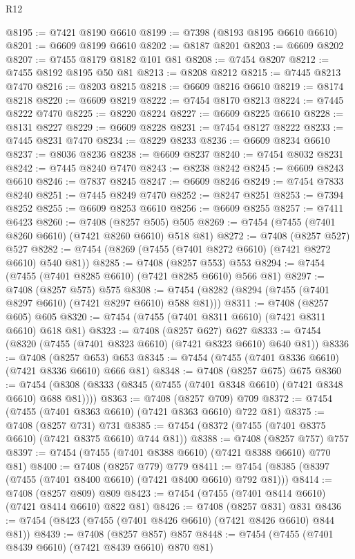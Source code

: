 \begin{lexlean}{R12}
\begin{coremodule}
{{{{{{{{{{{{{{{{{{{{{{{{{{{{{{{{{{{{{{{{{{{{{{{{{{{{{{{{{{{{{{{{{{{{{{{{{{{{{{{{{{@8195 := @7421 @8190 @6610
@8199 := @7398 (@8193 @8195 @6610 @6610)
@8201 := @6609 @8199 @6610
@8202 := @8187 @8201
@8203 := @6609 @8202
@8207 := @7455 @8179 @8182 @101 @81
@8208 := @7454 @8207
@8212 := @7455 @8192 @8195 @50 @81
@8213 := @8208 @8212
@8215 := @7445 @8213 @7470
@8216 := @8203 @8215
@8218 := @6609 @8216 @6610
@8219 := @8174 @8218
@8220 := @6609 @8219
@8222 := @7454 @8170 @8213
@8224 := @7445 @8222 @7470
@8225 := @8220 @8224
@8227 := @6609 @8225 @6610
@8228 := @8131 @8227
@8229 := @6609 @8228
@8231 := @7454 @8127 @8222
@8233 := @7445 @8231 @7470
@8234 := @8229 @8233
@8236 := @6609 @8234 @6610
@8237 := @8036 @8236
@8238 := @6609 @8237
@8240 := @7454 @8032 @8231
@8242 := @7445 @8240 @7470
@8243 := @8238 @8242
@8245 := @6609 @8243 @6610
@8246 := @7837 @8245
@8247 := @6609 @8246
@8249 := @7454 @7833 @8240
@8251 := @7445 @8249 @7470
@8252 := @8247 @8251
@8253 := @7394 @8252
@8255 := @6609 @8253 @6610
@8256 := @6609 @8255
@8257 := @7411 @6423
@8260 := @7408 (@8257 @505) @505
@8269 := @7454 (@7455 (@7401 @8260 @6610) (@7421 @8260 @6610) @518 @81)
@8272 := @7408 (@8257 @527) @527
@8282 := @7454 (@8269 (@7455 (@7401 @8272 @6610) (@7421 @8272 @6610) @540 @81))
@8285 := @7408 (@8257 @553) @553
@8294 := @7454 (@7455 (@7401 @8285 @6610) (@7421 @8285 @6610) @566 @81)
@8297 := @7408 (@8257 @575) @575
@8308 := @7454 (@8282 (@8294 (@7455 (@7401 @8297 @6610) (@7421 @8297 @6610) @588 @81)))
@8311 := @7408 (@8257 @605) @605
@8320 := @7454 (@7455 (@7401 @8311 @6610) (@7421 @8311 @6610) @618 @81)
@8323 := @7408 (@8257 @627) @627
@8333 := @7454 (@8320 (@7455 (@7401 @8323 @6610) (@7421 @8323 @6610) @640 @81))
@8336 := @7408 (@8257 @653) @653
@8345 := @7454 (@7455 (@7401 @8336 @6610) (@7421 @8336 @6610) @666 @81)
@8348 := @7408 (@8257 @675) @675
@8360 := @7454 (@8308 (@8333 (@8345 (@7455 (@7401 @8348 @6610) (@7421 @8348 @6610) @688 @81))))
@8363 := @7408 (@8257 @709) @709
@8372 := @7454 (@7455 (@7401 @8363 @6610) (@7421 @8363 @6610) @722 @81)
@8375 := @7408 (@8257 @731) @731
@8385 := @7454 (@8372 (@7455 (@7401 @8375 @6610) (@7421 @8375 @6610) @744 @81))
@8388 := @7408 (@8257 @757) @757
@8397 := @7454 (@7455 (@7401 @8388 @6610) (@7421 @8388 @6610) @770 @81)
@8400 := @7408 (@8257 @779) @779
@8411 := @7454 (@8385 (@8397 (@7455 (@7401 @8400 @6610) (@7421 @8400 @6610) @792 @81)))
@8414 := @7408 (@8257 @809) @809
@8423 := @7454 (@7455 (@7401 @8414 @6610) (@7421 @8414 @6610) @822 @81)
@8426 := @7408 (@8257 @831) @831
@8436 := @7454 (@8423 (@7455 (@7401 @8426 @6610) (@7421 @8426 @6610) @844 @81))
@8439 := @7408 (@8257 @857) @857
@8448 := @7454 (@7455 (@7401 @8439 @6610) (@7421 @8439 @6610) @870 @81)
}}}}}}}}}}}}}}}}}}}}}}}}}}}}}}}}}}}}}}}}}}}}}}}}}}}}}}}}}}}}}}}}}}}}}}}}}}}}}}}}}}
\end{coremodule}
\end{lexlean}
